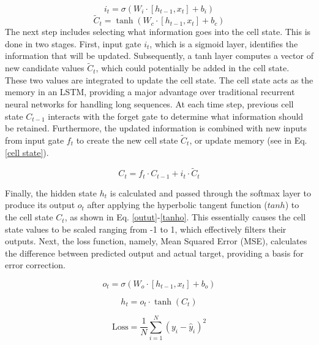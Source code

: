 \documentclass[journal]{IEEEtran}
\begin{document}
\begin{equation}\label{input}
i_t = \sigma(W_i \cdot [h_{t-1}, x_t] + b_i)
\end{equation}
\begin{equation}\label{tanh input}
\tilde{C}_t = \tanh(W_c \cdot [h_{t-1}, x_t] + b_c)
\end{equation}
The next step includes selecting what information goes into the cell state. This is done in two stages. First, input gate $i_t$, which is a sigmoid layer, identifies the information that will be updated. Subsequently, a tanh layer computes a vector of new candidate values $\tilde{C}_t$, which could potentially be added in the cell state. These two values are integrated to update the cell state. The cell state acts as the memory in an LSTM, providing a major advantage over traditional recurrent neural networks for handling long sequences. At each time step, previous cell state $C_{t-1}$ interacts with the forget gate to determine what information should be retained. Furthermore, the updated information is combined with new inputs from input gate $f_t$ to create the new cell state $\tilde{C}_t$, or update memory (see in Eq. \eqref{cell state}).

   
\begin{equation}\label{cell state}
C_t = f_t \cdot C_{t-1} + i_t \cdot \tilde{C}_t
\end{equation}

Finally, the hidden state $h_t$ is calculated and passed through the softmax layer to produce its output $o_t$ after applying the hyperbolic tangent function ($tanh$) to the cell state $C_t$, as shown in Eq. \eqref{outut}-\eqref{tanho}. This essentially causes the cell state values to be scaled ranging from -1 to 1, which effectively filters their outputs. Next, the loss function, namely, Mean Squared Error (MSE),  calculates the difference between predicted output and actual target, providing a basis for error correction.




\begin{equation}\label{outut}
o_t = \sigma(W_o \cdot [h_{t-1}, x_t] + b_o)
\end{equation}



\begin{equation}\label{tanho}
h_t = o_t \cdot \tanh(C_t)
\end{equation}




\begin{equation} \label{Loss}
\text{Loss} = \frac{1}{N} \sum_{i=1}^{N} \left( y_i - \hat{y}_i \right)^2
\end{equation}
\end{document}
